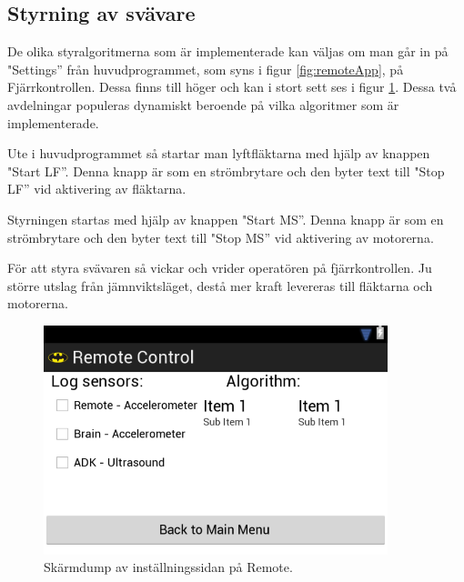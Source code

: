 \subsection{Styrning av svävare}
De olika styralgoritmerna som är implementerade kan väljas om man går in på
"Settings” från huvudprogrammet, som syns i figur \ref{fig:remoteApp}, på
Fjärrkontrollen.
Dessa finns till höger och kan i stort sett ses i figur \ref{fig:remoteSettings}. Dessa två
avdelningar populeras dynamiskt beroende på vilka algoritmer som är implementerade.

Ute i huvudprogrammet så startar man lyftfläktarna med hjälp av knappen "Start
LF”. Denna knapp är som en strömbrytare och den byter text till "Stop LF” vid
aktivering av fläktarna.

Styrningen startas med hjälp av knappen "Start
MS”. Denna knapp är som en strömbrytare och den byter text till "Stop MS” vid
aktivering av motorerna.

För att styra svävaren så vickar och vrider operatören på fjärrkontrollen. Ju
större utslag från jämnviktsläget, destå mer kraft levereras till fläktarna och
motorerna.

\begin{figure}[htbp!]
\centering
\includegraphics[width=10cm]{../../includes/figures/remote_settings.png}
\caption{Skärmdump av inställningssidan på Remote.}
\label{fig:remoteSettings}
\end{figure}
